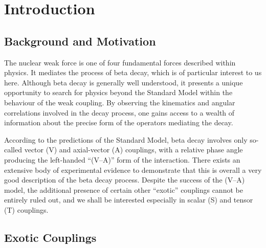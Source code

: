 


\clearpage
\chapter{Introduction}
\label{intro_chapter}

\section{Background and Motivation}
The nuclear weak force is one of four fundamental forces described within physics.  It mediates the process of beta decay, which is of particular interest to us here.  Although beta decay is generally well understood, it presents a unique opportunity to search for physics beyond the Standard Model within the behaviour of the weak coupling.  By observing the kinematics and angular correlations involved in the decay process, one gains access to a wealth of information about the precise form of the operators mediating the decay.  

According to the predictions of the Standard Model, beta decay involves only so-called vector (V) and axial-vector (A) couplings, with a relative phase angle producing the left-handed ``(V--A)'' form of the interaction.   There exists an extensive body of experimental evidence to demonstrate that this is overall a very good description of the beta decay process.    Despite the success of the (V--A) model, the additional presence of certain other ``exotic'' couplings cannot be entirely ruled out, and we shall be interested especially in scalar (S) and tensor (T) couplings.  


\section{Exotic Couplings}

